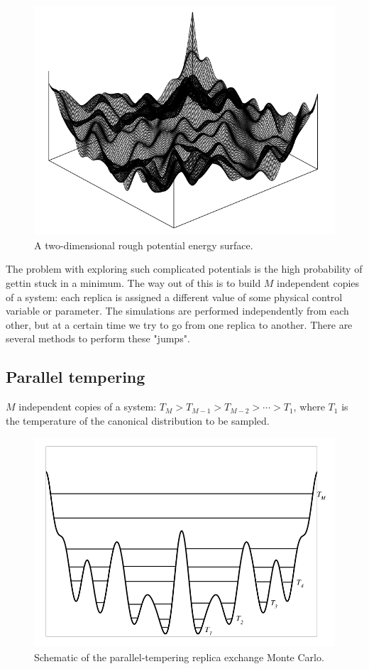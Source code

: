 \begin{figure}[H]
		\centering
		\includegraphics[scale=0.5]{rough}
		\caption{A two-dimensional rough potential energy surface.}
		\label{fig:rough}
	\end{figure}

The problem with exploring such complicated potentials is the high probability of gettin stuck in a minimum.
The way out of this is to build $M$ independent copies of a system: each replica is assigned a different value of some physical control variable or parameter.
The simulations are performed independently from each other, but at a certain time we try to go from one replica to another.
There are several methods to perform these "jumps".

	\subsection{Parallel tempering}
	$M$ independent copies of a system: $T_M>T_{M-1}>T_{M-2}>\cdots>T_1$, where $T_1$ is the temperature of the canonical distribution to be sampled.
	
	\begin{figure}[H]
		\centering
		\includegraphics[scale=0.5]{RE}
		\caption{Schematic of the parallel-tempering replica exchange Monte Carlo.}
		\label{fig:RE}
	\end{figure}
	
